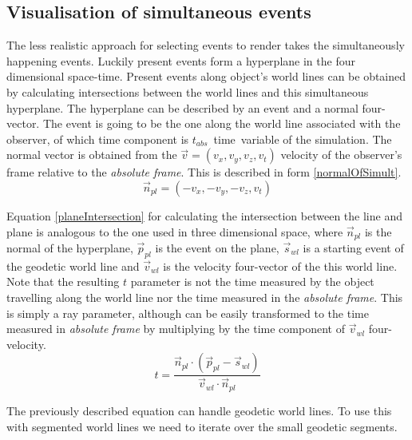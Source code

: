 \documentclass{egpubl}
\begin{document}
\subsection{Visualisation of simultaneous events}
\label{visOfSimEvents}
The less realistic approach for selecting events to render takes the simultaneously happening events. Luckily present events form a hyperplane in the four dimensional space-time. Present events along object's world lines can be obtained by calculating intersections between the world lines and this simultaneous hyperplane. The hyperplane can be described by an event and a normal four-vector. The event is going to be the one along the world line associated with the observer, of which time component is $t_{abs}$~time~variable of the simulation. The normal vector is obtained from the $\vec{v}=(v_x, v_y, v_z, v_t)$ velocity of the observer's frame relative to the \emph{absolute frame}. This is described in form \ref{normalOfSimult}.
\begin{equation}
\vec{n}_{pl} = (-v_x, -v_y, -v_z, v_t)
\label{normalOfSimult}
\end{equation}

Equation \ref{planeIntersection} for calculating the intersection between the line and plane is analogous to the one used in three dimensional space, where $\vec{n}_{pl}$ is the normal of the hyperplane, $\vec{p}_{pl}$ is the event on the plane, $\vec{s}_{wl}$ is a starting event of the geodetic world line and $\vec{v}_{wl}$ is the velocity four-vector of the this world line. Note that the resulting $t$ parameter is not the time measured by the object travelling along the world line nor the time measured in the \emph{absolute frame}. This is simply a ray parameter, although can be easily transformed to the time measured in \emph{absolute frame} by multiplying by the time component of $\vec{v}_{wl}$ four-velocity.
\begin{equation}
\label{planeIntersection}
t = \frac{\vec{n}_{pl}\cdot(\vec{p}_{pl} - \vec{s}_{wl})}{\vec{v}_{wl}\cdot\vec{n}_{pl}}
\end{equation}

The previously described equation can handle geodetic world lines. To use this with segmented world lines we need to iterate over the small geodetic segments. 
\end{document}
